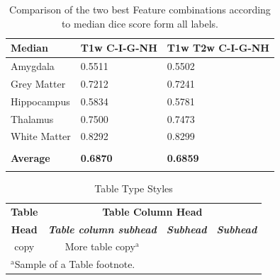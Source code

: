 \documentclass[conference]{IEEEtran}
\begin{document}
\begin{table}[h!]
\begin{center}
\begin{tabular}{lll}
\textbf{Median}  & \textbf{T1w C-I-G-NH} & \textbf{T1w T2w C-I-G-NH} \\\hline
Amygdala         & 0.5511                & 0.5502                    \\
Grey Matter      & 0.7212                & 0.7241                    \\
Hippocampus      & 0.5834                & 0.5781                    \\
Thalamus         & 0.7500                & 0.7473                    \\
White Matter     & 0.8292                & 0.8299                    \\
                 &                       &                           \\
\textbf{Average} & \textbf{0.6870}       & \textbf{0.6859}           \\
\\
\end{tabular}
\caption{Comparison of the two best Feature combinations according to median dice score form all labels.}
\end{center}
\label{table:Median}
\end{table}


\begin{table}[htbp]
\caption{Table Type Styles}
\begin{center}
\begin{tabular}{|c|c|c|c|}
\hline
\textbf{Table}&\multicolumn{3}{|c|}{\textbf{Table Column Head}} \\
\cline{2-4} 
\textbf{Head} & \textbf{\textit{Table column subhead}}& \textbf{\textit{Subhead}}& \textbf{\textit{Subhead}} \\
\hline
copy& More table copy$^{\mathrm{a}}$& &  \\
\hline
\multicolumn{4}{l}{$^{\mathrm{a}}$Sample of a Table footnote.}
\end{tabular}
\label{tab1}
\end{center}
\end{table}
\end{document}
